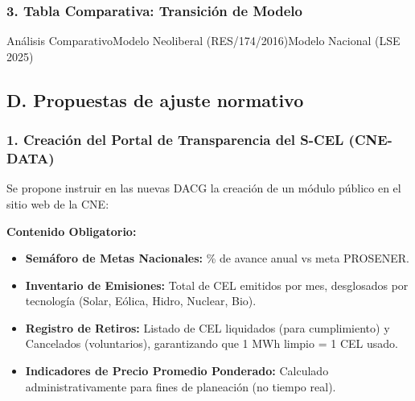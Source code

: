 \documentclass{cel}
\begin{document}
\subsubsection{3. Tabla Comparativa: Transición de Modelo}
\nopagebreak

\vspace{0.3cm}
\begin{tablaParadigmaV2}{Análisis Comparativo}{Modelo Neoliberal (RES/174/2016)}{Modelo Nacional (LSE 2025)}
\end{tablaParadigmaV2}

\subsection{D. Propuestas de ajuste normativo}
\nopagebreak

\subsubsection{1. Creación del Portal de Transparencia del S-CEL (CNE-DATA)}
\nopagebreak

Se propone instruir en las nuevas DACG la creación de un módulo público en el sitio web de la CNE:


\textbf{Contenido Obligatorio:}


\begin{itemize}
\item \textbf{Semáforo de Metas Nacionales:} \% de avance anual vs meta PROSENER.
\item \textbf{Inventario de Emisiones:} Total de CEL emitidos por mes, desglosados por tecnología (Solar, Eólica, Hidro, Nuclear, Bio).
\item \textbf{Registro de Retiros:} Listado de CEL liquidados (para cumplimiento) y Cancelados (voluntarios), garantizando que \textquotedbl{}1 MWh limpio = 1 CEL usado\textquotedbl{}.
\item \textbf{Indicadores de Precio Promedio Ponderado:} Calculado administrativamente para fines de planeación (no tiempo real).

\end{itemize}
\end{document}
